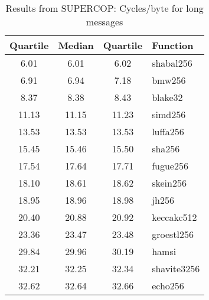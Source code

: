 \begin{table}
  \centering
  \begin{tabular}{ | c | c | c | l | }
    \hline
    \textbf{Quartile} & \textbf{Median} & \textbf{Quartile} & \textbf{Function} \\ \hline
    6.01 & 6.01 & 6.02 & shabal256 \\ \hline
    6.91 & 6.94 & 7.18 & bmw256 \\ \hline
    8.37 & 8.38 & 8.43 & blake32 \\ \hline
    11.13 & 11.15 & 11.23 & simd256 \\ \hline
    13.53 & 13.53 & 13.53 & luffa256 \\ \hline
    15.45 & 15.46 & 15.50 & sha256 \\ \hline
    17.54 & 17.64 & 17.71 & fugue256 \\ \hline
    18.10 & 18.61 & 18.62 & skein256 \\ \hline
    18.95 & 18.96 & 18.98 & jh256 \\ \hline
    20.40 & 20.88 & 20.92 & keccakc512 \\ \hline
    23.36 & 23.47 & 23.48 & groestl256 \\ \hline
    29.84 & 29.96 & 30.19 & hamsi \\ \hline
    32.21 & 32.25 & 32.34 & shavite3256 \\ \hline
    32.62 & 32.64 & 32.66 & echo256 \\ \hline
  \end{tabular}
  \caption{Results from SUPERCOP: Cycles/byte for long messages}
  \label{tbl:supercop:long}
\end{table}
